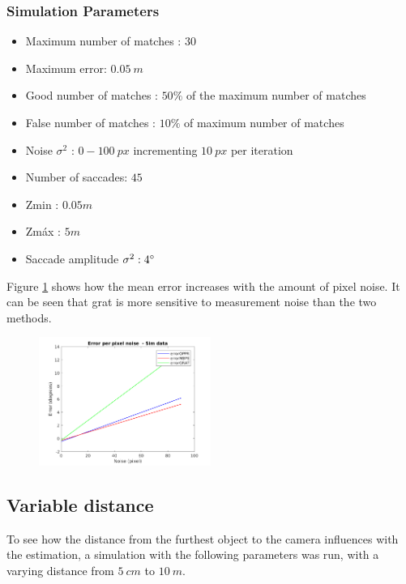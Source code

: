 \subsubsection{Simulation Parameters}
\begin{itemize}
	\item Maximum number of matches : $30$
	\item Maximum error: $0.05 \ m$
	\item Good number of matches : $50 \%$ of the maximum number of matches
	\item False number of matches : $10 \%$ of maximum number of matches
	\item Noise $\sigma^2$ : $0-100 \ px$ incrementing $10 \ px$ per iteration
	\item Number of saccades: $45$
	\item Zmin : $0.05 m$
	\item Zmáx : $5 m$
	\item Saccade amplitude $\sigma^2 : 4 \degree $
\end{itemize}
Figure \ref{cha5:sec1:noise} shows how the mean error increases with the amount of pixel noise. It can be seen that \acrshort{grat} is more sensitive to measurement noise than the two methods.
\begin{figure}[ht]
	\centering
	\includegraphics[width=0.5\textwidth]{images/sim/noise.png}
	\label{cha5:sec1:noise}
\end{figure}

\subsection{Variable distance}
To see how the distance from the furthest object to the camera influences with the estimation, a simulation with the following parameters was run, with a varying distance from $5 \ cm$ to $10 \ m$.
